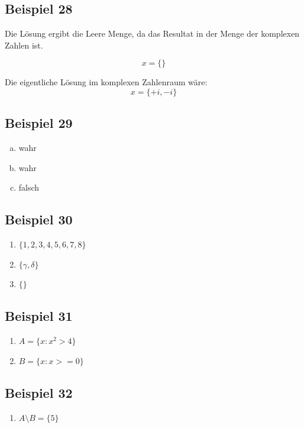 \documentclass[12pt, a4paper, oneside]{article}
\begin{document}
\subsection{Beispiel 28}
Die Lösung ergibt die Leere Menge, da das Resultat in der Menge der komplexen Zahlen ist.

\begin{equation*}
  x = \{\}
\end{equation*}

Die eigentliche Lösung im komplexen Zahlenraum wäre:
\begin{equation*}
  x = \{+i, -i\}
\end{equation*}

\subsection{Beispiel 29}
\begin{enumerate}[a)]
  \item wahr
  \item wahr
  \item falsch
\end{enumerate}

\subsection{Beispiel 30}
\begin{enumerate}
  \item $\{1, 2, 3, 4, 5, 6, 7, 8\}$
  \item $\{\gamma, \delta\}$
  \item $\{\}$
\end{enumerate}

\subsection{Beispiel 31}
\begin{enumerate}[$\bullet$]
  \item $A = \{x : x^{2} > 4\}$
  \item $B = \{x: x >= 0\}$
\end{enumerate}

\subsection{Beispiel 32}
\begin{enumerate}[$\bullet$]
  \item $A \setminus B = \{5\}$
\end{enumerate}
\end{document}

